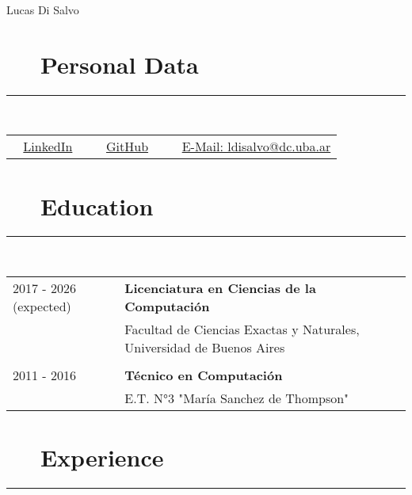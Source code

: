 \documentclass{article}
\begin{document}
\pagestyle{empty}

\par{\centering
		{\huge Lucas Di Salvo}
	\bigskip\par}

\section*{\faAt ~~ Personal Data} 
\hrule

\
\newline
\

\begin{tabular}{l | l | l}
      \faLinkedin ~ \href{https://www.linkedin.com/in/lucas-di-salvo-6578b915a}{LinkedIn} \
     & \faGithub ~ \href{https://github.com/lucasDS-0}{GitHub}  \
     & \faEnvelope ~ \href{mailto:ldisalvo@dc.uba.ar}{E-Mail: ldisalvo@dc.uba.ar}
\end{tabular}

\section*{\faBook ~~ Education} 
\hrule

\
\newline
\

\begin{tabular}{l l}
    2017 - 2026 (expected)  & \textbf{Licenciatura en Ciencias de la Computación}\\
                    & Facultad de Ciencias Exactas y Naturales, Universidad de Buenos Aires \\ \\
    2011 - 2016 & \textbf{Técnico en Computación} \\
                & E.T. N°3 "María Sanchez de Thompson"
\end{tabular}

\section*{\faCubes ~~ Experience} 
\hrule

\
\newline
\
\end{document}
